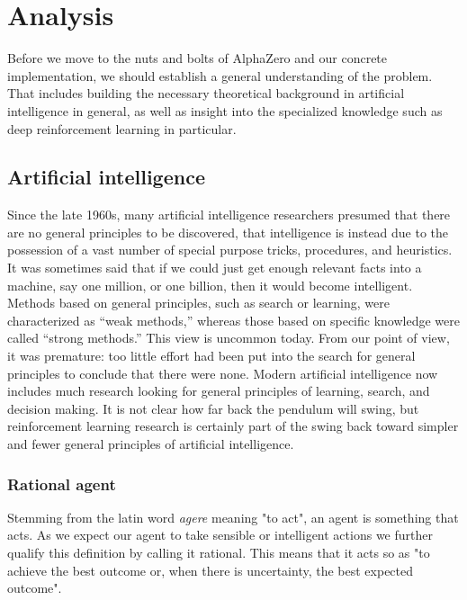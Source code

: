 \chapter{Analysis}
Before we move to the nuts and bolts of AlphaZero and our concrete implementation, we should establish a general understanding of the problem. That includes building the necessary theoretical background in artificial intelligence in general, as well as insight into the specialized knowledge such as deep reinforcement learning in particular.

\section{Artificial intelligence}
Since the late 1960s, many artificial intelligence researchers presumed that there are no general principles to be discovered, that intelligence is instead due to the possession of a vast number of special purpose tricks, procedures, and heuristics. It was sometimes said that if we could just get enough relevant facts into a machine, say one million, or one billion, then it would become intelligent. Methods based on general principles, such as search or learning, were characterized as “weak methods,” whereas those based on specific knowledge were called “strong methods.” This view is uncommon today. From our point of view, it was premature: too little effort had been put into the search for general principles to conclude that there were none. Modern artificial intelligence now includes much research looking for general principles of learning, search, and decision making. It is not clear how far back the pendulum will swing, but reinforcement learning research is certainly part of the swing back toward simpler and fewer general principles of artificial intelligence.


\subsection{Rational agent}
Stemming from the latin word \textit{agere} meaning "to act", an agent is something that acts. As we expect our agent to take sensible or intelligent actions we further qualify this definition by calling it rational. This means that it acts so as "to achieve the best outcome or, when there is uncertainty, the best expected outcome". \cite[p. 36]{russell_artificial_2021}

